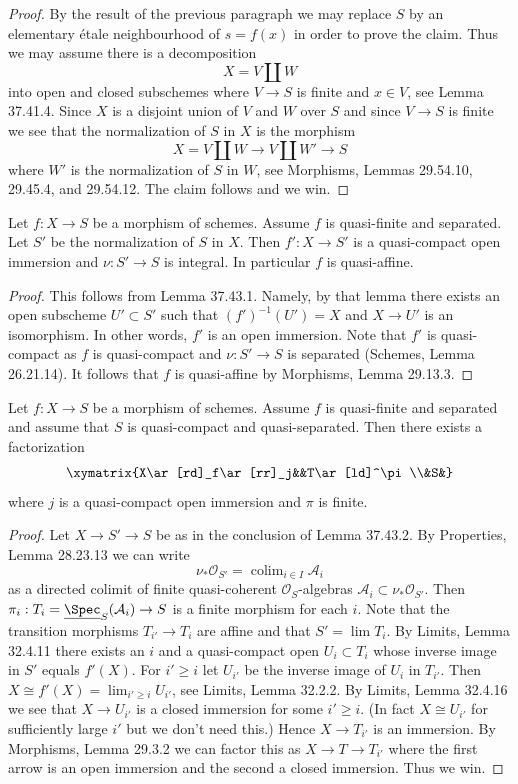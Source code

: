\begin{proof}
By the result of the previous paragraph we may replace $S$ by an elementary étale neighbourhood of $s=f(x)$ in order to prove the claim. Thus we may assume there is a decomposition
\[X=V\amalg W\]
into open and closed subschemes where $V\to S$ is finite and $x\in V$, see Lemma 37.41.4. Since $X$ is a disjoint union of $V$ and $W$ over $S$ and since $V\to S$ is finite we see that the normalization of $S$ in $X$ is the morphism
\[X=V\amalg W\longrightarrow V\amalg W'\longrightarrow S\]
where $W'$ is the normalization of $S$ in $W$, see Morphisms, Lemmas 29.54.10, 29.45.4, and 29.54.12. The claim follows and we win.
\end{proof}

\begin{lemma}[37.43.2]
Let $f:X\to S$ be a morphism of schemes. Assume $f$ is quasi-finite and separated. Let $S'$ be the normalization of $S$ in $X$. Then $f':X\to S'$ is a quasi-compact open immersion and $\nu:S'\to S$ is integral. In particular $f$ is quasi-affine.
\end{lemma}
\begin{proof}
This follows from Lemma 37.43.1. Namely, by that lemma there exists an open subscheme $U'\subset S'$ such that $(f')^{-1}(U')=X$ and $X\to U'$ is an isomorphism. In other words, $f'$ is an open immersion. Note that $f'$ is quasi-compact as $f$ is quasi-compact and $\nu:S'\to S$ is separated (Schemes, Lemma 26.21.14). It follows that $f$ is quasi-affine by Morphisms, Lemma 29.13.3.
\end{proof}

\begin{lemma}
Let $f:X\to S$ be a morphism of schemes. Assume $f$ is quasi-finite and separated and assume that $S$ is quasi-compact and quasi-separated. Then there exists a factorization
\[
\xymatrix{X\ar[rd]_f\ar[rr]_j&&T\ar[ld]^\pi\\&S&}
\]
where $j$ is a quasi-compact open immersion and $\pi$ is finite.
\end{lemma}
\begin{proof}
Let $X\to S'\to S$ be as in the conclusion of Lemma 37.43.2. By Properties, Lemma 28.23.13 we can write
\[
\nu_*\mathcal O_{S'}=\mathop{\mathrm{colim}}_{i\in I}\mathcal A_i
\]
as a directed colimit of finite quasi-coherent $\mathcal O_S$-algebras $\mathcal A_i\subset\nu_*\mathcal O_{S'}$. Then $\pi_i:T_i=\underline{\Spec}_S(\mathcal A_i)\to S$ is a finite morphism for each $i$. Note that the transition morphisms $T_{i'}\to T_i$ are affine and that $S'=\mathop{\mathrm{lim}}T_i$. By Limits, Lemma 32.4.11 there exists an $i$ and a quasi-compact open $U_i\subset T_i$ whose inverse image in $S'$ equals $f'(X)$. For $i'\geq i$ let $U_{i'}$ be the inverse image of $U_i$ in $T_{i'}$. Then $X\cong f'(X)=\mathop{\mathrm{lim}}_{i'\geq i}U_{i'}$, see Limits, Lemma 32.2.2. By Limits, Lemma 32.4.16 we see that $X\to U_{i'}$ is a closed immersion for some $i'\geq i$. (In fact $X\cong U_{i'}$ for sufficiently large $i'$ but we don't need this.) Hence $X\to T_{i'}$ is an immersion. By Morphisms, Lemma 29.3.2 we can factor this as $X\to T\to T_{i'}$ where the first arrow is an open immersion and the second a closed immersion. Thus we win.
\end{proof}

